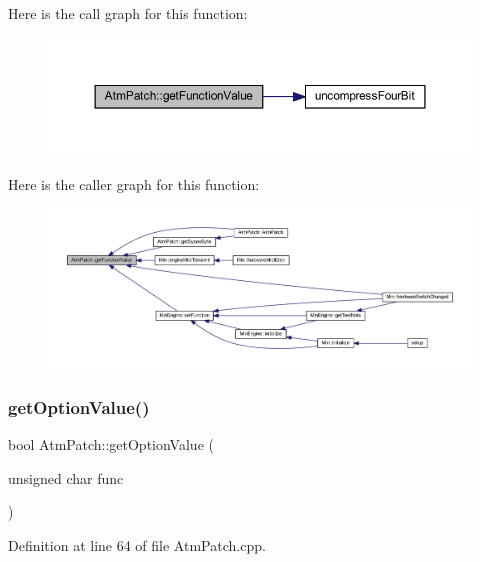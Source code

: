 Here is the call graph for this function\+:
\nopagebreak
\begin{figure}[H]
\begin{center}
\leavevmode
\includegraphics[width=350pt]{d9/de1/class_atm_patch_a7b4184a7f5bd314e150f9ad38cc3a0fb_cgraph}
\end{center}
\end{figure}
Here is the caller graph for this function\+:
\nopagebreak
\begin{figure}[H]
\begin{center}
\leavevmode
\includegraphics[width=350pt]{d9/de1/class_atm_patch_a7b4184a7f5bd314e150f9ad38cc3a0fb_icgraph}
\end{center}
\end{figure}
\mbox{\label{class_atm_patch_ab521c0a108bf7f8bc848755c38330bc0}} 
\subsubsection{\texorpdfstring{get\+Option\+Value()}{getOptionValue()}}
{\footnotesize\ttfamily bool Atm\+Patch\+::get\+Option\+Value (\begin{DoxyParamCaption}\item[{unsigned char}]{func }\end{DoxyParamCaption})}



Definition at line 64 of file Atm\+Patch.\+cpp.

